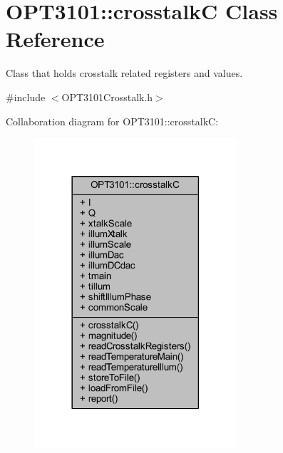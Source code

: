 \hypertarget{class_o_p_t3101_1_1crosstalk_c}{}\section{O\+P\+T3101\+:\+:crosstalkC Class Reference}
\label{class_o_p_t3101_1_1crosstalk_c}


Class that holds crosstalk related registers and values.  




{\ttfamily \#include $<$O\+P\+T3101\+Crosstalk.\+h$>$}



Collaboration diagram for O\+P\+T3101\+:\+:crosstalkC\+:\nopagebreak
\begin{figure}[H]
\begin{center}
\leavevmode
\includegraphics[width=213pt]{class_o_p_t3101_1_1crosstalk_c__coll__graph}
\end{center}
\end{figure}
